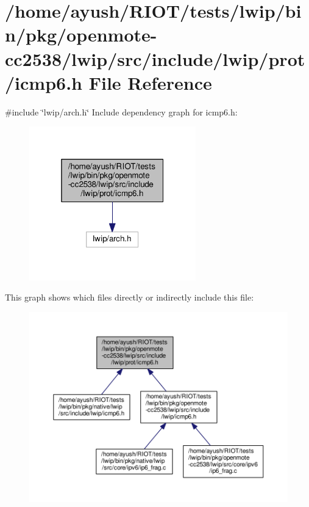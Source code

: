 \hypertarget{openmote-cc2538_2lwip_2src_2include_2lwip_2prot_2icmp6_8h}{}\section{/home/ayush/\+R\+I\+O\+T/tests/lwip/bin/pkg/openmote-\/cc2538/lwip/src/include/lwip/prot/icmp6.h File Reference}
\label{openmote-cc2538_2lwip_2src_2include_2lwip_2prot_2icmp6_8h}
{\ttfamily \#include \char`\"{}lwip/arch.\+h\char`\"{}}\newline
Include dependency graph for icmp6.\+h\+:
\nopagebreak
\begin{figure}[H]
\begin{center}
\leavevmode
\includegraphics[width=205pt]{openmote-cc2538_2lwip_2src_2include_2lwip_2prot_2icmp6_8h__incl}
\end{center}
\end{figure}
This graph shows which files directly or indirectly include this file\+:
\nopagebreak
\begin{figure}[H]
\begin{center}
\leavevmode
\includegraphics[width=350pt]{openmote-cc2538_2lwip_2src_2include_2lwip_2prot_2icmp6_8h__dep__incl}
\end{center}
\end{figure}
